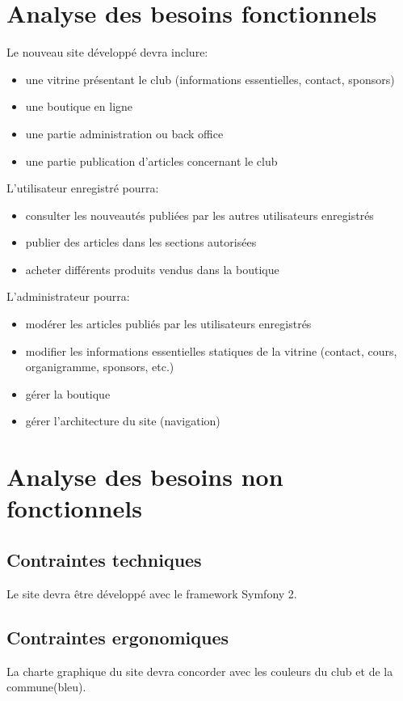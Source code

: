 \documentclass[a4paper,12pt, notitlepage]{report}
\begin{document}
\chapter{Analyse des besoins fonctionnels}
Le nouveau site développé devra inclure:
\begin{itemize}
\item{une vitrine présentant le club (informations essentielles, contact, sponsors)}
\item{une boutique en ligne}
\item{une partie administration ou back office}
\item{une partie publication d’articles concernant le club}
\end{itemize}

L’utilisateur enregistré pourra:

\begin{itemize}
\item{consulter les nouveautés publiées par les autres utilisateurs enregistrés}
\item{publier des articles dans les sections autorisées}
\item{acheter différents produits vendus dans la boutique}
\end{itemize}

L’administrateur pourra:
\begin{itemize}
\item{modérer les articles publiés par les utilisateurs enregistrés}
\item{modifier les informations essentielles statiques de la vitrine (contact, cours, organigramme, sponsors, etc.)}
\item{gérer la boutique}
\item{gérer l’architecture du site (navigation)}
\end{itemize}


\chapter{Analyse des besoins non fonctionnels}
\section{Contraintes techniques}
Le site devra être développé avec le framework Symfony 2.
\section{Contraintes ergonomiques}
La charte graphique du site devra concorder avec les couleurs du club et de la commune(bleu).
\end{document}
